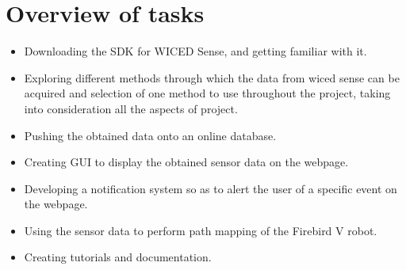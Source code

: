 \documentclass[a4paper,12pt,oneside]{book}
\begin{document}
\newpage
\section{Overview of tasks}
\begin{itemize}
  \item Downloading the SDK for WICED Sense, and getting familiar with it.
  \item  Exploring different methods through which the data from wiced sense can be acquired and selection of one method to use throughout the project, taking into consideration all the aspects of project.
  \item Pushing the obtained data onto an online database.
  \item Creating GUI to display the obtained sensor data on the webpage.
  \item Developing a notification system so as to alert the user of a specific event on the webpage.
  \item Using the sensor data to perform path mapping of the Firebird V robot.
  \item Creating tutorials and documentation.
\end{itemize}


\tableofcontents
\listoffigures
\newpage


\end{document}
